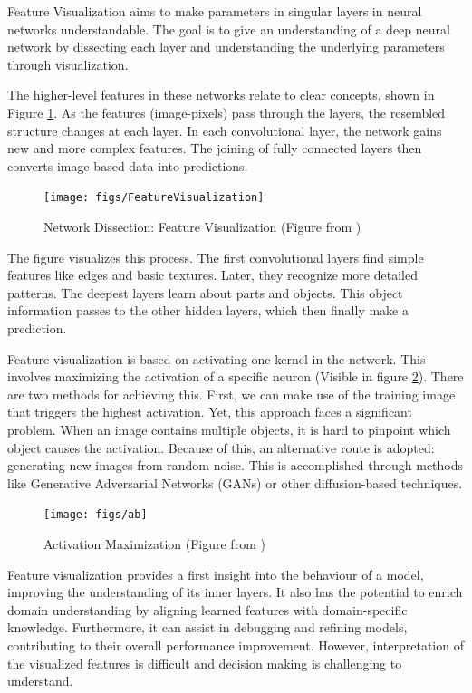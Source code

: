 Feature Visualization aims to make parameters in singular layers in neural networks understandable. The goal is to give an understanding of a deep neural network by dissecting each layer and understanding the underlying parameters through visualization.

The higher-level features in these networks relate to clear concepts, shown in Figure \ref{fig:feature-visualization}. As the features (image-pixels) pass through the layers, the resembled structure changes at each layer. In each convolutional layer, the network gains new and more complex features. The joining of fully connected layers then converts image-based data into predictions.
\\
\begin{figure}[H]
	\centering
	\texttt{[image: figs/FeatureVisualization]}
	\caption[Network Dissection: Feature Visualization ]{Network Dissection: Feature Visualization (Figure from \cite{olah2017feature})}
	\label{fig:feature-visualization}
\end{figure}

The figure visualizes this process. The first convolutional layers find simple features like edges and basic textures. Later, they recognize more detailed patterns. The deepest layers learn about parts and objects. This object information passes to the other hidden layers, which then finally make a prediction.

Feature visualization is based on activating one kernel in the network. This involves maximizing the activation of a specific neuron (Visible in figure \ref*{fig:optimization}). There are two methods for achieving this. First, we can make use of the training image that triggers the highest activation. Yet, this approach faces a significant problem. When an image contains multiple objects, it is hard to pinpoint which object causes the activation. Because of this, an alternative route is adopted: generating new images from random noise. This is accomplished through methods like Generative Adversarial Networks (GANs) \cite{goodfellow2014generative} or other diffusion-based techniques\cite{zhang2023survey}.

\begin{figure}[H]
	\centering
	\texttt{[image: figs/ab]}
	\caption[Activation Maximization]{Activation Maximization (Figure from \cite{olah2017feature})}
	\label{fig:optimization}
\end{figure}

Feature visualization provides a first insight into the behaviour of a model, improving the understanding of its inner layers. It also has the potential to enrich domain understanding by aligning learned features with domain-specific knowledge. Furthermore, it can assist in debugging and refining models, contributing to their overall performance improvement. However, interpretation of the visualized features is difficult and decision making is challenging to understand.

